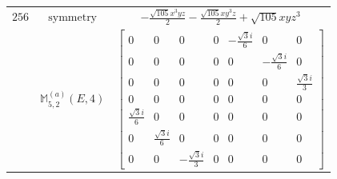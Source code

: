\documentclass[fleqn,8pt,landscape]{jsarticle}
\begin{document}
\begin{longtable}{ccc}
$ 256 $ & $ \text{symmetry} $ & $ - \frac{\sqrt{105} x^{3} y z}{2} - \frac{\sqrt{105} x y^{3} z}{2} + \sqrt{105} x y z^{3} $ \\
$  $ & $ \mathbb{M}_{5,2}^{(a)}(E,4) $ & $ \begin{bmatrix} 0 & 0 & 0 & 0 & - \frac{\sqrt{3} i}{6} & 0 & 0 \\ 0 & 0 & 0 & 0 & 0 & - \frac{\sqrt{3} i}{6} & 0 \\ 0 & 0 & 0 & 0 & 0 & 0 & \frac{\sqrt{3} i}{3} \\ 0 & 0 & 0 & 0 & 0 & 0 & 0 \\ \frac{\sqrt{3} i}{6} & 0 & 0 & 0 & 0 & 0 & 0 \\ 0 & \frac{\sqrt{3} i}{6} & 0 & 0 & 0 & 0 & 0 \\ 0 & 0 & - \frac{\sqrt{3} i}{3} & 0 & 0 & 0 & 0 \end{bmatrix} $ \\ \hline
\end{longtable}
\end{document}
